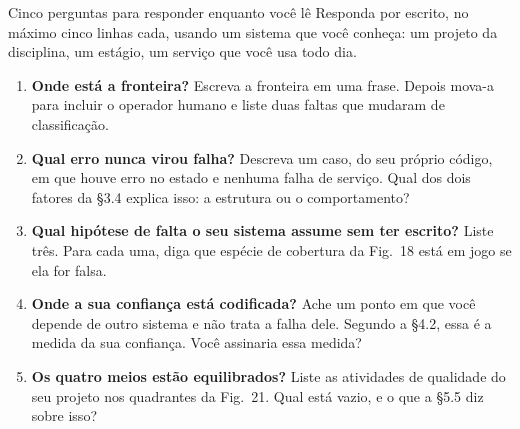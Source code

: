 \documentclass{beamer}
\begin{document}
\begin{frame}{Cinco perguntas para responder enquanto voc\^e l\^e}
    \footnotesize
    Responda por escrito, no m\'aximo cinco linhas cada, usando um sistema que voc\^e conhe\c{c}a: um projeto da disciplina, um est\'agio, um servi\c{c}o que voc\^e usa todo dia.
    \medskip
    \begin{enumerate}
        \item \textbf{Onde est\'a a fronteira?} Escreva a fronteira em uma frase. Depois mova-a para incluir o operador humano e liste duas faltas que mudaram de classifica\c{c}\~ao.
        \medskip
        \item \textbf{Qual erro nunca virou falha?} Descreva um caso, do seu pr\'oprio c\'odigo, em que houve erro no estado e nenhuma falha de servi\c{c}o. Qual dos dois fatores da \S3.4 explica isso: a estrutura ou o comportamento?
        \medskip
        \item \textbf{Qual hip\'otese de falta o seu sistema assume sem ter escrito?} Liste tr\^es. Para cada uma, diga que esp\'ecie de cobertura da Fig.\ 18 est\'a em jogo se ela for falsa.
        \medskip
        \item \textbf{Onde a sua confian\c{c}a est\'a codificada?} Ache um ponto em que voc\^e depende de outro sistema e n\~ao trata a falha dele. Segundo a \S4.2, essa \'e a medida da sua confian\c{c}a. Voc\^e assinaria essa medida?
        \medskip
        \item \textbf{Os quatro meios est\~ao equilibrados?} Liste as atividades de qualidade do seu projeto nos quadrantes da Fig.\ 21. Qual est\'a vazio, e o que a \S5.5 diz sobre isso?
    \end{enumerate}
\end{frame}
\end{document}
